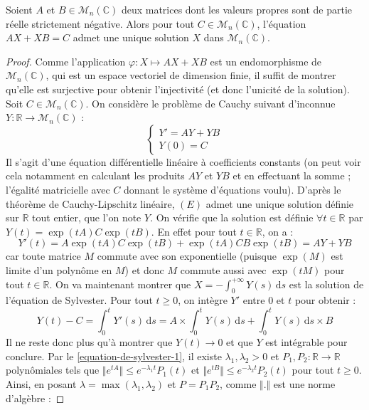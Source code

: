 
	\begin{theorem}
		Soient $A$ et $B \in \mathcal{M}_n(\mathbb{C})$ deux matrices dont les valeurs propres sont de partie réelle strictement négative. Alors pour tout $C \in \mathcal{M}_n(\mathbb{C})$, l'équation $AX + XB = C$ admet une unique solution $X$ dans $\mathcal{M}_n(\mathbb{C})$.
	\end{theorem}

	\begin{proof}
		Comme l'application $\varphi : X \mapsto AX + XB$ est un endomorphisme de $\mathcal{M}_n(\mathbb{C})$, qui est un espace vectoriel de dimension finie, il suffit de montrer qu'elle est surjective pour obtenir l'injectivité (et donc l'unicité de la solution). Soit $C \in \mathcal{M}_n(\mathbb{C})$. On considère le problème de Cauchy suivant d'inconnue $Y : \mathbb{R} \rightarrow \mathcal{M}_n(\mathbb{C})$ :
		\[ \begin{cases} Y' = AY + YB \\ Y(0) = C \end{cases} \tag{$E$} \]
		Il s'agit d'une équation différentielle linéaire à coefficients constants (on peut voir cela notamment en calculant les produits $AY$ et $YB$ et en effectuant la somme ; l'égalité matricielle avec $C$ donnant le système d'équations voulu). D'après le théorème de Cauchy-Lipschitz linéaire, $(E)$ admet une unique solution définie sur $\mathbb{R}$ tout entier, que l'on note $Y$.
		\newpar
		On vérifie que la solution est définie $\forall t \in \mathbb{R}$ par $Y(t) = \exp(tA) C \exp(tB)$. En effet pour tout $t \in \mathbb{R}$, on a :
		\[ Y'(t) = A \exp(tA) C \exp(tB) + \exp(tA) CB \exp(tB) = AY + YB \]
		car toute matrice $M$ commute avec son exponentielle (puisque $\exp(M)$ est limite d'un polynôme en $M$) et donc $M$ commute aussi avec $\exp(tM)$ pour tout $t \in \mathbb{R}$.
		\newpar
		On va maintenant montrer que $X = - \int_{0}^{+\infty} Y(s) \, \mathrm{d}s$ est la solution de l'équation de Sylvester. Pour tout $t \geq 0$, on intègre $Y'$ entre $0$ et $t$ pour obtenir :
		\[ Y(t) - C = \int_0^t Y'(s) \, \mathrm{d}s = A \times \int_0^t Y(s) \, \mathrm{d}s + \int_0^t Y(s) \, \mathrm{d}s \times B \]
		Il ne reste donc plus qu'à montrer que $Y(t) \longrightarrow 0$ et que $Y$ est intégrable pour conclure. Par le \cref{equation-de-sylvester-1}, il existe $\lambda_1, \lambda_2 > 0$ et $P_1, P_2 : \mathbb{R} \rightarrow \mathbb{R}$ polynômiales tels que $\Vert e^{tA} \Vert \leq e^{- \lambda_1 t} P_1(t)$ et $\Vert e^{tB} \Vert \leq e^{-\lambda_2 t} P_2(t)$ pour tout $t \geq 0$. Ainsi, en posant $\lambda = \max(\lambda_1, \lambda_2)$ et $P = P_1 P_2$, comme $\Vert . \Vert$ est une norme d'algèbre :

\end{proof}
